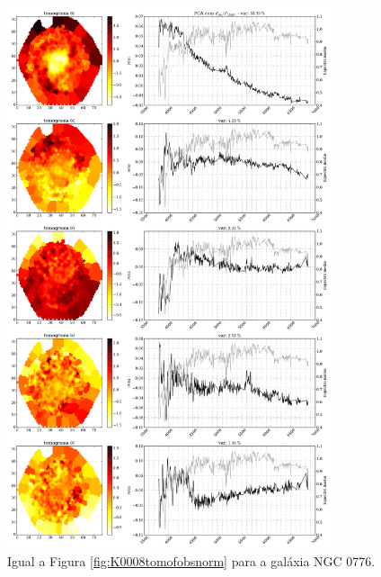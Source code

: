 \begin{figure}
    \includegraphics[width=0.85\textwidth]{figuras/K0073-tomo-obs-norm.pdf}
    \caption[Tomogramas de 1 a 5 para o cubo $F_{obs}$ norm. - NGC 0776.]
    {Igual a Figura \ref{fig:K0008tomofobsnorm} para a galáxia NGC 0776.}
    \label{fig:K0073tomofobsnorm}
\end{figure}

